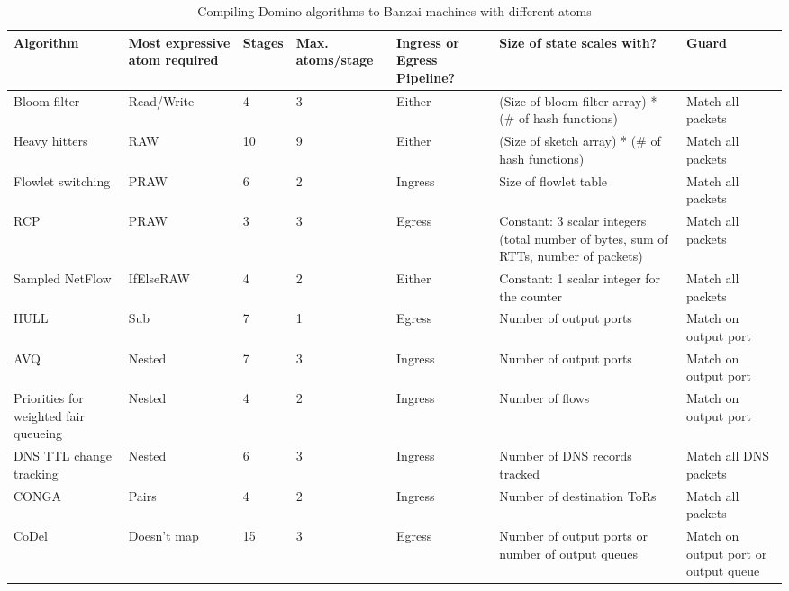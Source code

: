 \begin{table}[!t]
\begin{small}
\begin{tabular}{|p{}|p{}|p{}|p{}|p{}|p{}|p{}|}
\hline
Algorithm & Most expressive atom required & Stages & Max. atoms/stage & Ingress or Egress Pipeline? & Size of state scales with? & Guard \\
\hline
Bloom filter & Read/Write & 4 & 3 & Either & (Size of bloom filter array) * (\# of hash functions) & Match all packets \\
\hline
Heavy hitters & RAW & 10 & 9 & Either & (Size of sketch array) * (\# of hash functions) & Match all packets \\
\hline
Flowlet switching & PRAW & 6 & 2 & Ingress & Size of flowlet table & Match all packets \\
\hline
RCP & PRAW & 3 & 3 & Egress & Constant: 3 scalar integers (total number of bytes, sum of RTTs, number of packets) & Match all packets \\
\hline
Sampled NetFlow & IfElseRAW & 4 & 2 & Either & Constant: 1 scalar integer for the counter & Match all packets \\
\hline
HULL & Sub & 7 & 1 & Egress & Number of output ports & Match on output port \\
\hline
AVQ & Nested & 7 & 3 & Ingress & Number of output ports & Match on output port \\
\hline
Priorities for weighted fair queueing & Nested & 4 & 2 & Ingress & Number of flows & Match on output port \\
\hline
DNS TTL change tracking~\cite{dns_change} & Nested & 6 & 3 & Ingress & Number of DNS records tracked & Match all DNS packets  \\
\hline
CONGA & Pairs & 4 & 2 & Ingress & Number of destination ToRs & Match all packets \\
\hline
CoDel & Doesn't map & 15 & 3 & Egress & Number of output ports or number of output queues & Match on output port or output queue \\
\hline
\end{tabular}
\end{small}
\caption{Compiling Domino algorithms to Banzai machines with different atoms}
\label{tab:algo_atoms}
\end{table}
